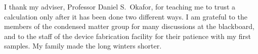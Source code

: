 I thank my adviser, Professor Daniel S.\ Okafor, for teaching me to trust a calculation only
after it has been done two different ways. I am grateful to the members of the condensed
matter group for many discussions at the blackboard, and to the staff of the device
fabrication facility for their patience with my first samples. My family made the long
winters shorter.

